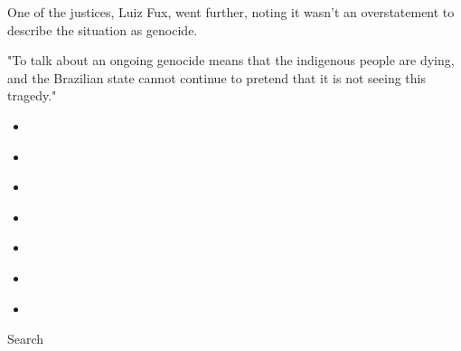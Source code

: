 One of the justices, Luiz Fux, went further, noting it wasn't an
overstatement to describe the situation as genocide.

"To talk about an ongoing genocide means that the indigenous people are
dying, and the Brazilian state cannot continue to pretend that it is not
seeing this tragedy."

\begin{itemize}
\item
\end{itemize}

\begin{itemize}
\item
\end{itemize}

\begin{itemize}
\item
\end{itemize}

\begin{itemize}
\item
\end{itemize}

\begin{itemize}
\item
\end{itemize}

\begin{itemize}
\item
\end{itemize}

\begin{itemize}
\item
\end{itemize}

Search

